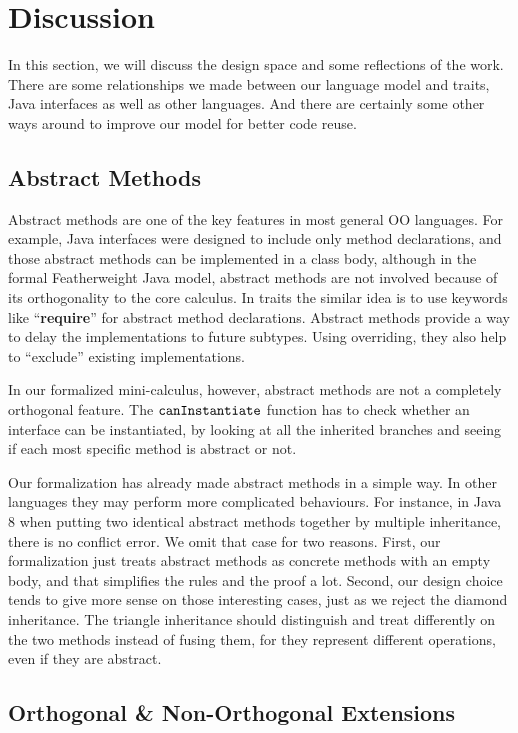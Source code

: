 \section{Discussion}
In this section, we will discuss the design space and some reflections of the work. There are some relationships we made
between our language model and traits, Java interfaces as well as other languages. And there are certainly some other ways
around to improve our model for better code reuse.

\subsection{Abstract Methods}

Abstract methods are one of the key features in most general OO languages. For example, Java interfaces were designed
to include only method declarations, and those abstract methods can be implemented in a class body, although in the formal
Featherweight Java model, abstract methods are not involved because of its orthogonality to the core calculus. In traits the
similar idea is to use keywords like ``\textbf{require}'' for abstract method declarations. Abstract methods provide a way to
delay the implementations to future subtypes. Using overriding, they also help to ``exclude'' existing implementations.

In our formalized mini-calculus, however, abstract methods are not a completely orthogonal feature. The $\texttt{canInstantiate}$ function
has to check whether an interface can be instantiated, by looking at all the inherited branches and seeing if each most specific method
is abstract or not.

Our formalization has already made abstract methods in a simple way. In other languages they may perform more complicated behaviours.
For instance, in Java 8 when putting two identical abstract methods together by multiple inheritance, there is no conflict error. We omit
that case for two reasons. First, our formalization just treats abstract methods as concrete methods with an empty body, and that simplifies
the rules and the proof a lot. Second, our design choice tends to give more sense on those interesting cases, just as we reject the diamond inheritance. The triangle inheritance should distinguish and treat differently on the two methods instead of fusing them, for they represent different operations, even if they are abstract.

\subsection{Orthogonal \& Non-Orthogonal Extensions}

